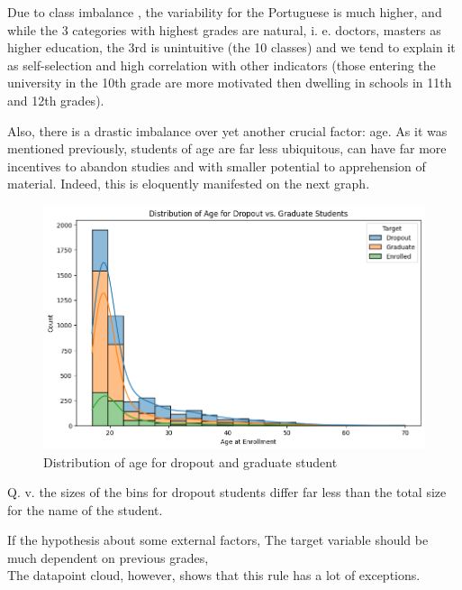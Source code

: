 \documentclass[
  letterpaper,
  DIV=11,
  numbers=noendperiod]{scrartcl}
\begin{document}
Due to class imbalance , the variability for the Portuguese is much
higher, and while the 3 categories with highest grades are natural, i.
e. doctors, masters as higher education, the 3rd is unintuitive (the 10
classes) and we tend to explain it as self-selection and high
correlation with other indicators (those entering the university in the
10th grade are more motivated then dwelling in schools in 11th and 12th
grades).

Also, there is a drastic imbalance over yet another crucial factor: age.
As it was mentioned previously, students of age are far less ubiquitous,
can have far more incentives to abandon studies and with smaller
potential to apprehension of material. Indeed, this is eloquently
manifested on the next graph.

\begin{figure}

{\centering \includegraphics{report_AzadhdhinNedalYunisAlFraijat_files/figure-pdf/fig-age-distr-output-1.png}

}

\caption{\label{fig-age-distr}Distribution of age for dropout and
graduate student}

\end{figure}

Q. v. the sizes of the bins for dropout students differ far less than
the total size for the name of the student.

If the hypothesis about some external factors, The target variable
should be much dependent on previous grades,\\
The datapoint cloud, however, shows that this rule has a lot of
exceptions.
\end{document}
